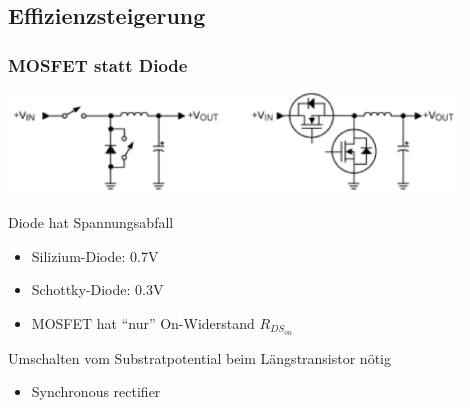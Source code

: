 \subsection{Effizienzsteigerung}
	\subsubsection{MOSFET statt Diode}
		\includegraphics[width=12cm]{images/effizient1}
		\begin{itemize}
		\begin{minipage}{8cm}
 		 	\item Diode hat Spannungsabfall
  			\begin{itemize}
    			\item Silizium-Diode: 0.7V
   				\item Schottky-Diode: 0.3V
    			\item MOSFET hat "`nur"' On-Widerstand $R_{DS_{on}}$
			\end{itemize}
		\end{minipage}
		\begin{minipage}{8cm}
			\item Umschalten vom Substratpotential beim Längstransistor nötig
   			\begin{itemize}
     			\item Synchronous rectifier
    		\end{itemize}
		\end{minipage}
		\end{itemize}